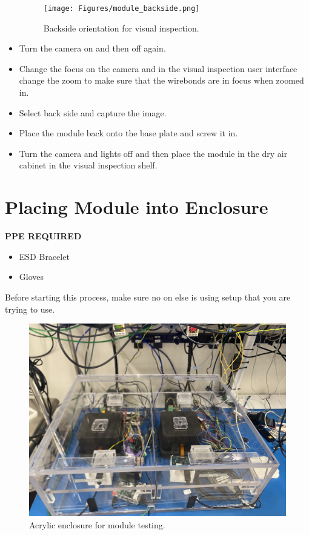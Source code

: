 \documentclass[12pt]{article}
\begin{document}
\begin{itemize}
\begin{figure}[H]
    \centering
    \texttt{[image: Figures/module\_backside.png]}
    \caption{Backside orientation for visual inspection.}
    \label{fig:back-side}
\end{figure}

    \item Turn the camera on and then off again.  
    \item Change the focus on the camera and in the visual inspection user interface change the zoom to make sure that the wirebonds are in focus when zoomed in. 
    \item Select back side and capture the image. 
    \item Place the module back onto the base plate and screw it in. 
    \item Turn the camera and lights off and then place the module in the dry air cabinet in the visual inspection shelf.
\end{itemize}

\newpage
\section{Placing Module into Enclosure}
\label{sec:enclosure}
\textbf{PPE REQUIRED}
\begin{itemize}
    \item ESD Bracelet
    \item Gloves
\end{itemize}

Before starting this process, make sure no on else is using setup that you are trying to use. 


\begin{figure}[H]
    \centering
    \includegraphics[width=0.5\linewidth]{Figures/enclosure.jpg}
    \caption{Acrylic enclosure for module testing.}
    \label{fig:enclosure}
\end{figure}
\end{document}

